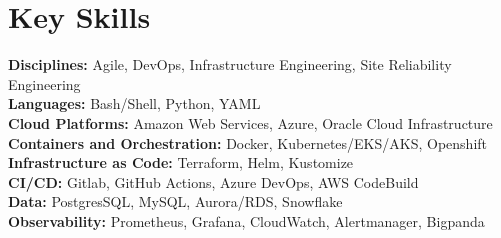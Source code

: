 \documentclass[letterpaper,10.5pt]{article}
\makeatletter
\newcommand{\resumeItem}[1]{
  \item\small{
    {#1 \vspace{-2pt}}
  }
}
\newcommand{\resumeProjectHeading}[2]{
    \vspace{-2pt}\item
    \begin{tabular*}{0.97\textwidth}{l@{\extracolsep{\fill}}r}
      \small#1 & #2 \\
    \end{tabular*}\vspace{-7pt}
}
\newcommand{\resumeSubHeadingListStart}{\begin{itemize}[leftmargin=0.15in, label={}]}
\newcommand{\resumeSubHeadingListEnd}{\end{itemize}}
\newcommand{\resumeItemListStart}{\begin{itemize}}
\newcommand{\resumeItemListEnd}{\end{itemize}\vspace{-5pt}}
\makeatother
\begin{document}

\section{Key Skills}
  \vspace{2pt}
  \resumeSubHeadingListStart
    \small{\item{
        \textbf{Disciplines:}{ Agile, DevOps, Infrastructure Engineering, Site Reliability Engineering} \\ \vspace{3pt}
        \textbf{Languages:}{ Bash/Shell, Python, YAML} \\ \vspace{3pt}
        \textbf{Cloud Platforms:}{ Amazon Web Services, Azure, Oracle Cloud Infrastructure} \\ \vspace{3pt}
        \textbf{Containers and Orchestration:}{ Docker, Kubernetes/EKS/AKS, Openshift } \\ \vspace{3pt}
        \textbf{Infrastructure as Code:}{ Terraform, Helm, Kustomize} \\ \vspace{3pt}
        \textbf{CI/CD:}{ Gitlab, GitHub Actions, Azure DevOps, AWS CodeBuild} \\ \vspace{3pt}
        \textbf{Data:}{ PostgresSQL, MySQL, Aurora/RDS, Snowflake} \\ \vspace{3pt}   
        \textbf{Observability:}{ Prometheus, Grafana, CloudWatch, Alertmanager, Bigpanda} \\ \vspace{3pt}
    }}
  \resumeSubHeadingListEnd



      
           
\end{document}

